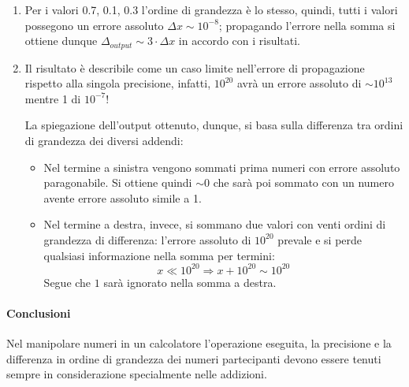 \begin{enumerate}

	\item Per i valori 0.7, 0.1, 0.3 l’ordine di grandezza è lo stesso, quindi,
	      tutti i valori possegono un errore assoluto $\Delta x \sim 10^{-8}$; propagando
	      l’errore nella somma si ottiene dunque $\Delta_{output} \sim 3 \cdot \Delta x$ in accordo con
	      i risultati.

	\item Il risultato è describile come un caso limite nell’errore di propagazione rispetto
	      alla singola precisione, infatti, $10^{20}$ avrà un errore assoluto di $\sim 10^{13}$
	      mentre 1 di $10^{-7}$!

	      La spiegazione dell'output ottenuto, dunque, si basa sulla differenza
	      tra ordini di grandezza dei diversi addendi:
	      \begin{itemize}
		      \item Nel termine a sinistra
		            vengono sommati prima numeri con errore assoluto paragonabile.
		            Si ottiene quindi $\sim 0$ che sarà poi sommato con un numero
		            avente errore assoluto simile a 1.

		      \item
		            Nel termine a destra, invece, si sommano due valori con venti
		            ordini di grandezza di differenza: l’errore assoluto di
		            $10^{20}$ prevale e si perde qualsiasi informazione nella somma per termini:
		            $$x \ll 10^{20} \Rightarrow x + 10^{20} \sim 10^{20}$$
		            Segue che $\mathit{1}$ sarà ignorato nella somma a destra.
	      \end{itemize}

\end{enumerate}

\paragraph{Conclusioni}
Nel manipolare numeri in un calcolatore l’operazione eseguita, la precisione e
la differenza in ordine di grandezza dei numeri partecipanti devono essere tenuti
sempre in considerazione specialmente nelle addizioni.

